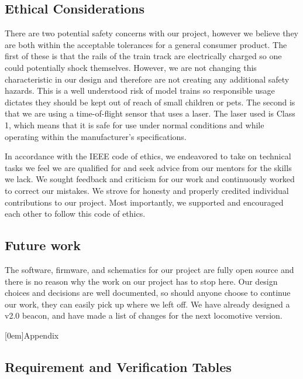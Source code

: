 \documentclass[openbib,letterpaper,10pt]{article}
\newcommand{\setappenstyle}{
	\titleformat{\section}{\color{titlecolor}\Large\bf}{\color{titlecolor}Appendix \Alph{section}}{0.8em}{}
	\titlecontents{section}[0em]{}{Appendix \thecontentslabel \hspace{1em}}{}{\titlerule*[0.5pc]{.}\contentspage}
}
\begin{document}
\begin{spacing}{1.15}
\subsection{Ethical Considerations}
There are two potential safety concerns with our project, however we believe they are both within the acceptable tolerances for a general consumer product. The first of these is that the rails of the train track are electrically charged so one could potentially shock themselves. However, we are not changing this characteristic in our design and therefore are not creating any additional safety hazards. This is a well understood risk of model trains so responsible usage dictates they should be kept out of reach of small children or pets. The second is that we are using a time-of-flight sensor that uses a laser. The laser used is Class 1, which means that it is safe for use under normal conditions and while operating within the manufacturer's specifications\cite{VL6180X}.\par

In accordance with the IEEE code of ethics, we endeavored to take on technical tasks we feel we are qualified for and seek advice from our mentors for the skills we lack. We sought feedback and criticism for our work and continuously worked to correct our mistakes. We strove for honesty and properly credited individual contributions to our project. Most importantly, we supported and encouraged each other to follow this code of ethics.

\subsection{Future work}
The software, firmware, and schematics for our project are fully open source and there is no reason why the work on our project has to stop here. Our design choices and decisions are well documented, so should anyone choose to continue our work, they can easily pick up where we left off. We have already designed a v2.0 beacon, and have made a list of changes for the next locomotive version.

\clearpage



\clearpage
\setappenstyle
\begin{appendix}
\section{Requirement and Verification Tables}


\end{appendix}
\end{spacing}
\end{document}
